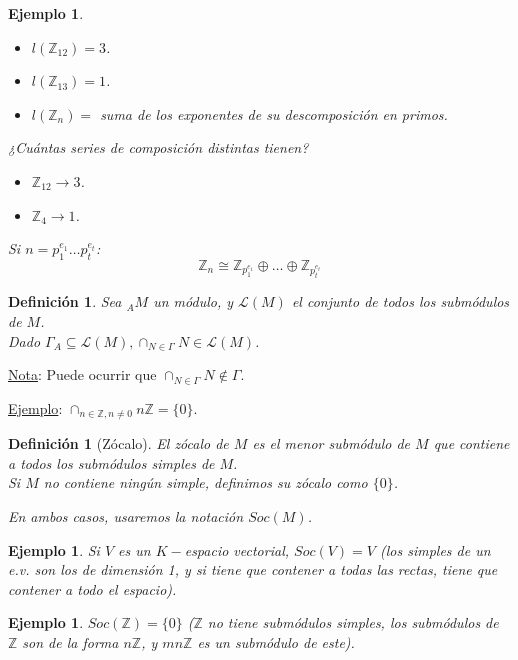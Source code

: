 \documentclass[11pt,a4paper]{article}
\theoremstyle{break}
\newtheorem{example}[theorem]{Ejemplo}
\newtheorem{definition}[theorem]{Definición}
\begin{document}
\begin{example}
\begin{itemize}
\item $l(\mathbb{Z}_{12}) = 3$.
\item $l(\mathbb{Z}_{13}) = 1$.
\item $l(\mathbb{Z}_{n}) =$ suma de los exponentes de su descomposición en primos.
\end{itemize}

¿Cuántas series de composición distintas tienen?
\begin{itemize}
\item $\mathbb{Z}_{12} \rightarrow 3$.
\item $\mathbb{Z}_{4} \rightarrow 1$.
\end{itemize}

Si $n = p_{1}^{e_{1}} \dots p_{t}^{e_{t}}$:
$$\mathbb{Z}_{n} \cong \mathbb{Z}_{p_{1}^{e_{1}}} \oplus \dots \oplus \mathbb{Z}_{p_{t}^{e_{t}}}$$
\end{example}


\begin{definition}
Sea $_{A}M$ un módulo, y $\mathcal{L}(M)$ el conjunto de todos los submódulos de $M$. \\
Dado $\Gamma_{A} \subseteq \mathcal{L}(M), \cap_{N \in \Gamma} N \in \mathcal{L}(M)$.
\end{definition}

\underline{Nota}: Puede ocurrir que $\cap_{N \in \Gamma} N \notin \Gamma$.

\underline{Ejemplo}: $\cap_{n \in \mathbb{Z}, n \neq 0} n \mathbb{Z} = \{0\}$.

\begin{definition}[Zócalo]
El zócalo de $M$ es el menor submódulo de $M$ que contiene a todos los submódulos simples de $M$. \\
Si $M$ no contiene ningún simple, definimos su zócalo como $\{0\}$.

En ambos casos, usaremos la notación $Soc(M)$.
\end{definition}

\begin{example}
Si $V$ es un $K-$espacio vectorial, $Soc(V) = V$ (los simples de un e.v. son los de dimensión 1, y si tiene que contener a todas las rectas, tiene que contener a todo el espacio).
\end{example}

\begin{example}
$Soc(\mathbb{Z}) = \{0\}$ ($\mathbb{Z}$ no tiene submódulos simples, los submódulos de $\mathbb{Z}$ son de la forma $n\mathbb{Z}$, y $mn\mathbb{Z}$ es un submódulo de este).
\end{example}
\end{document}
